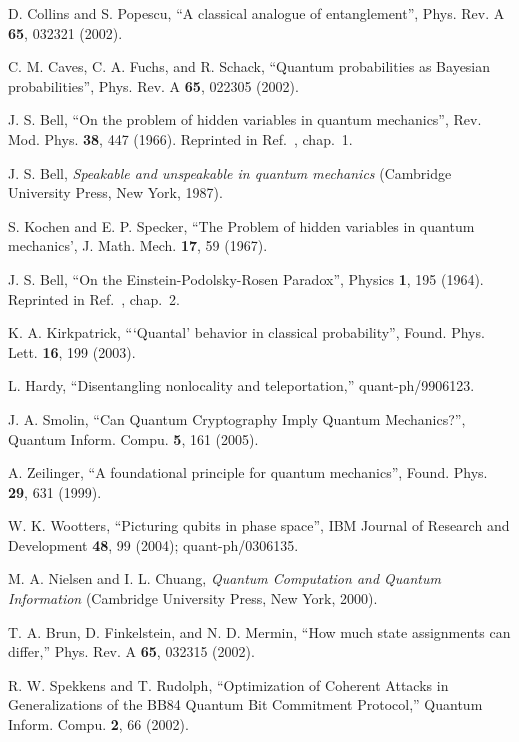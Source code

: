 \documentclass[pra,nofootinbib,showpacs,12pt]{revtex4}
\begin{document}
\begin{thebibliography}{99}
 D. Collins and S. Popescu, ``A classical analogue of
entanglement'', Phys. Rev. A \textbf{65}, 032321 (2002).

 C. M. Caves, C. A. Fuchs, and R. Schack, ``Quantum
probabilities as Bayesian probabilities'', Phys. Rev. A \textbf{65}, 022305
(2002).

 J. S. Bell, ``On the problem of hidden variables in quantum
mechanics'', Rev. Mod. Phys. \textbf{38}, 447 (1966). Reprinted in Ref.~\cite%
{Bellbook}, chap.~1.

 J. S. Bell, \textit{Speakable and unspeakable in quantum
mechanics} (Cambridge University Press, New York, 1987).

 S. Kochen and E. P. Specker, ``The Problem of hidden
variables in quantum mechanics', J. Math. Mech. \textbf{17}, 59 (1967).

 J. S. Bell, ``On the Einstein-Podolsky-Rosen Paradox'',
Physics \textbf{1}, 195 (1964). Reprinted in Ref.~\cite{Bellbook}, chap.~2.



 K. A. Kirkpatrick, ```Quantal' behavior in classical
probability'', Found. Phys. Lett. \textbf{16}, 199 (2003).

 L. Hardy, ``Disentangling nonlocality and
teleportation,'' quant-ph/9906123.

 J. A. Smolin, ``Can Quantum Cryptography Imply Quantum
Mechanics?'', Quantum Inform. Compu. \textbf{5}, 161 (2005).

 A. Zeilinger, ``A foundational principle for quantum
mechanics'', Found. Phys. \textbf{29}, 631 (1999).

 W. K. Wootters, ``Picturing qubits in
phase space'', IBM Journal of Research and Development
\textbf{48}, 99 (2004); quant-ph/0306135.


 M. A. Nielsen and I. L. Chuang, \textit{Quantum
Computation and Quantum Information} (Cambridge University Press, New York,
2000).

 T. A. Brun, D. Finkelstein, and N. D. Mermin, ``How much state
assignments can differ,'' Phys. Rev. A \textbf{65}, 032315 (2002).

 R. W. Spekkens and T. Rudolph, ``Optimization
of Coherent Attacks in Generalizations of the BB84 Quantum Bit
Commitment Protocol,'' Quantum Inform. Compu. \textbf{2}, 66
(2002).


\end{thebibliography}
\end{document}
